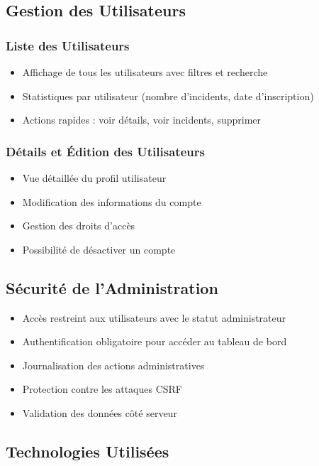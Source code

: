 \documentclass[12pt,a4paper]{article}
\begin{document}
\subsection{Gestion des Utilisateurs}

\subsubsection{Liste des Utilisateurs}
\begin{itemize}
    \item Affichage de tous les utilisateurs avec filtres et recherche
    \item Statistiques par utilisateur (nombre d'incidents, date d'inscription)
    \item Actions rapides : voir détails, voir incidents, supprimer
\end{itemize}

\subsubsection{Détails et Édition des Utilisateurs}
\begin{itemize}
    \item Vue détaillée du profil utilisateur
    \item Modification des informations du compte
    \item Gestion des droits d'accès
    \item Possibilité de désactiver un compte
\end{itemize}

\subsection{Sécurité de l'Administration}

\begin{itemize}
    \item Accès restreint aux utilisateurs avec le statut administrateur
    \item Authentification obligatoire pour accéder au tableau de bord
    \item Journalisation des actions administratives
    \item Protection contre les attaques CSRF
    \item Validation des données côté serveur
\end{itemize}

\subsection{Technologies Utilisées}
\end{document}
